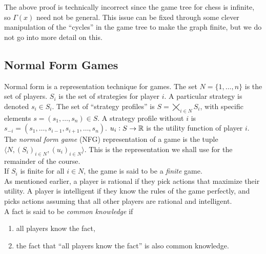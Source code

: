 	\begin{remark}
		The above proof is technically incorrect since the game tree for chess is infinite, so $\Gamma(x)$ need not be general. This issue can be fixed through some clever manipulation of the ``cycles'' in the game tree to make the graph finite, but we do not go into more detail on this.
	\end{remark}

\subsection{Normal Form Games}

	Normal form is a representation technique for games. The set $N = \{1,\ldots,n\}$ is the set of players. $S_i$ is the set of strategies for player $i$. A particular strategy is denoted $s_i \in S_i$. The set of ``strategy profiles'' is $S = \bigtimes_{i \in N} S_i$, with specific elements $s = (s_1,\ldots,s_n) \in S$. A strategy profile without $i$ is $s_{-i} = (s_1,\ldots,s_{i-1},s_{i+1},\ldots,s_n)$. $u_i : S \to \mathbb{R}$ is the utility function of player $i$.\\
	The \emph{normal form game} (NFG) representation of a game is the tuple $\langle N , (S_i)_{i \in N} , (u_i)_{i \in N} \rangle$. This is the representation we shall use for the remainder of the course. \\
	If $S_i$ is finite for all $i \in N$, the game is said to be a \emph{finite} game.\\

	As mentioned earlier, a player is rational if they pick actions that maximize their utility. A player is intelligent if they know the rules of the game perfectly, and picks actions assuming that all other players are rational and intelligent.\\

	A fact is said to be \emph{common knowledge} if
	\begin{enumerate}
		\item all players know the fact,
		\item the fact that ``all players know the fact'' is also common knowledge.
	\end{enumerate}

